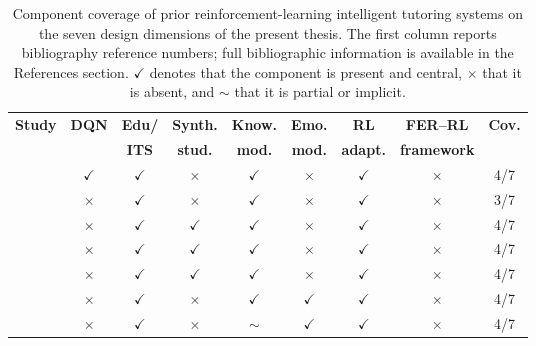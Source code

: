 \providecommand{\yes}{\textcolor{matrixGreen}{$\checkmark$}}
\providecommand{\no}{\textcolor{matrixRed}{$\times$}}
\providecommand{\partialc}{\textcolor{matrixAmber}{$\sim$}}

\begin{table}[H]
\centering
\footnotesize
\caption{Component coverage of prior reinforcement-learning
intelligent tutoring systems on the seven design dimensions of
the present thesis. The first column reports bibliography
reference numbers; full bibliographic information is available
in the References section.
\textcolor{matrixGreen}{$\checkmark$} denotes that the
component is present and central,
\textcolor{matrixRed}{$\times$} that it is absent, and
\textcolor{matrixAmber}{$\sim$} that it is partial or
implicit.}
\label{tab:rl_prior_matrix}
\setlength{\tabcolsep}{4pt}
\renewcommand{\arraystretch}{1.45}
\begin{tabular}{cccccccc c}
\toprule
\textbf{Study} & \textbf{\ac{DQN}} & \textbf{Edu/} & \textbf{Synth.} & \textbf{Know.} & \textbf{Emo.} & \textbf{\ac{RL}} & \textbf{\ac{FER}--\ac{RL}} & \textbf{Cov.} \\
 & & \textbf{\ac{ITS}} & \textbf{stud.} & \textbf{mod.} & \textbf{mod.} & \textbf{adapt.} & \textbf{framework} & \\
\midrule
\cite{sanz_ausin_leveraging_2019}                       & \yes & \yes & \no       & \yes & \no       & \yes & \no       & 4/7 \\
\cite{abdelshiheed_bridging_2023}                       & \no  & \yes & \no       & \yes & \no       & \yes & \no       & 3/7 \\
\cite{kubotani_rltutor_2021}                            & \no  & \yes & \yes      & \yes & \no       & \yes & \no       & 4/7 \\
\cite{bassen_using_2020}                                & \no  & \yes & \yes      & \yes & \no       & \yes & \no       & 4/7 \\
\cite{fahid_online_2024}                                & \no  & \yes & \yes      & \yes & \no       & \yes & \no       & 4/7 \\
\cite{perez_emotions_2024}                              & \no  & \yes & \no       & \yes & \yes      & \yes & \no       & 4/7 \\
\cite{govea_implementation_2024}                        & \no  & \yes & \no       & \partialc & \yes & \yes & \no       & 4/7 \\

\end{tabular}
\end{table}
